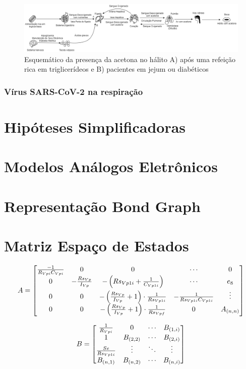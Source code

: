 \begin{figure}[H]
 \begin{center}
  \includegraphics[width=\textwidth]{figuras/_esq_sist.png}
   \caption{{Esquemático da presença da acetona no hálito A) após uma refeição rica em  triglicerídeos e B) pacientes em jejum ou diabéticos}}\label{esq_sistema}
  \end{center}
\end{figure}

\subsubsection{Vírus  SARS-CoV-2 na respiração}
\section{Hipóteses Simplificadoras}
\section{Modelos Análogos Eletrônicos}
\section{Representação Bond Graph}
\section{Matriz Espaço de Estados}

\newpage

\begin{landscape}
\begin{equation}\label{eq: estados_expandida0}
A
=  
\left[ \begin{matrix} 
\frac{-1}{R_{Vpi}C_{Vpi}}& 0 & 0 &\cdots  & 0\cr
0 & -\frac{Rs_{Vp}}{I_{Vp}} & -\left(Rs_{Vp1i}+\frac{1}{C_{Vp1i}}\right)&\cdots  & e_8\cr
0   & 0 & -\left(\frac{Rs_{Vp}}{I_{Vp}} + 1\right)\cdot\frac{1}{Rs_{Vp1i}}   & -\frac{1}{Rs_{Vp1i}C_{Vp1i}} &  \vdots   \cr
0 & 0 & -\left(\frac{Rs_{Vp}}{I_{Vp}} + 1\right)\cdot\frac{1}{Rs_{Vpf}}  & 0 & A_{(n,n)}\cr
\end{matrix} \right]
\end{equation}
\end{landscape}


\begin{equation}\label{eq: estados_expandida0}
B
=  
\left[ \begin{matrix} 
\frac{1}{R_{Vpi}} & 0 & \cdots  & B_{(1,i)}\cr
1 & B_{(2,2)} & \cdots  & B_{(2,i)}\cr
\frac{Se}{Rs_{Vp1i}}    & \vdots    & \ddots  & \vdots   \cr
B_{(n,1)} & B_{(n,2)} & \cdots  & B_{(n,i)}\cr
\end{matrix} \right] 
\end{equation}